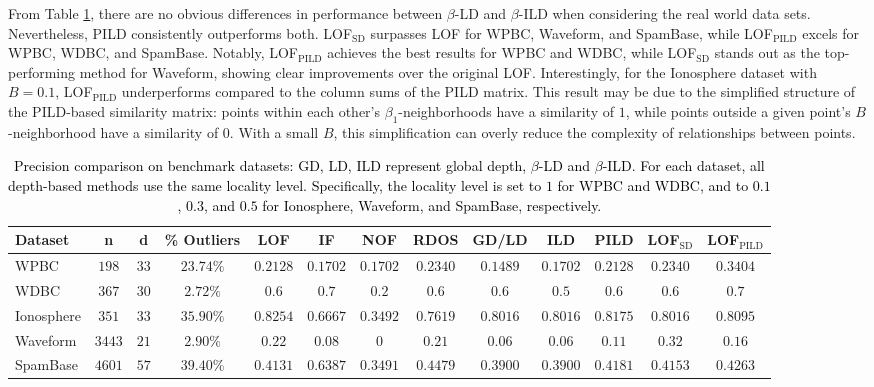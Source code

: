 \documentclass[final,3p,times]{elsarticle}
\begin{document}
From Table \ref{tab:results}, there are no obvious differences in performance between $\beta$-LD and $\beta$-ILD when considering the real world data sets. Nevertheless, PILD consistently outperforms both. LOF$_\text{SD}$ surpasses LOF for WPBC, Waveform, and SpamBase, while LOF$_\text{PILD}$ excels for WPBC, WDBC, and SpamBase. Notably, LOF$_\text{PILD}$ achieves the best results for WPBC and WDBC, while LOF$_\text{SD}$ stands out as the top-performing method for Waveform, showing clear improvements over the original LOF. Interestingly, for the Ionosphere dataset with $B=0.1$, LOF$_\text{PILD}$ underperforms compared to the column sums of the PILD matrix. This result may be due to the simplified structure of the PILD-based similarity matrix: points within each other's $\beta_1$-neighborhoods have a similarity of $1$, while points outside a given point's $B$-neighborhood have a similarity of $0$. With a small $B$, this simplification can overly reduce the complexity of relationships between points.  
\begin{table}[h!]
\centering
\caption{\textcolor{black}{Precision comparison on benchmark datasets: GD, LD, ILD represent global depth, $\beta$-LD and $\beta$-ILD. For each dataset, all depth-based methods use the same locality level. Specifically, the locality level is set to $1$ for WPBC and WDBC, and to $0.1$, $0.3$, and $0.5$ for Ionosphere, Waveform, and SpamBase, respectively.}}
\label{tab:results}
\begin{adjustbox}{max width=\textwidth}
\begin{tabular}{lccc|ccccccccc}
\toprule
\textbf{Dataset} & \textbf{n} & \textbf{d} & \textbf{\% Outliers} & \textbf{LOF} & \textbf{IF} & \textbf{NOF} & \textbf{RDOS} & \textbf{GD/LD} & \textbf{ILD} & \textbf{PILD} & \textbf{LOF$_\text{SD}$} & \textbf{LOF$_\text{PILD}$} \\
\midrule
WPBC        & $198$   & $33$  & $23.74\%$   & $0.2128$   & $0.1702$   & $0.1702$   & $0.2340$   & $0.1489$   & $0.1702$   & $0.2128$   & $0.2340$   & $\mathbf{0.3404}$   \\
WDBC        & $367$   & $30$  & $2.72\%$   & $0.6$   & $\mathbf{0.7}$   & $0.2$   & $0.6$   & $0.6$   & $0.5$   & $0.6$   & $0.6$   & $\mathbf{0.7}$   \\
Ionosphere  & $351$   & $33$  & $35.90\%$   & $\mathbf{0.8254}$   & $0.6667$   & $0.3492$   & $0.7619$   & $0.8016$   & $0.8016$   & $0.8175$   & $0.8016$   & $0.8095$   \\
Waveform    & $3443$   & $21$  & $2.90\%$   & $0.22$   & $0.08$   & $0$   & $0.21$   & $0.06$   & $0.06$   & $0.11$   & $\mathbf{0.32}$   & $0.16$   \\
SpamBase    & $4601$   & $57$  & $39.40\%$   & $0.4131$   & $\mathbf{0.6387}$   & $0.3491$   & $0.4479$   & $0.3900$   & $0.3900$   & $0.4181$   & $0.4153$   & $0.4263$   \\
\bottomrule
\end{tabular}
\end{adjustbox}
\end{table}
\end{document}
